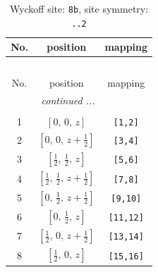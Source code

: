 \documentclass[fleqn,8pt]{jsarticle}
\begin{document}
\begin{longtable}{ccc}
\caption{Wyckoff site: {\tt 8b}, site symmetry: {\tt ..2}}
 \\
 \hline \hline
No. & position & mapping \\ \hline \endfirsthead

\multicolumn{2}{l}{\tablename\ \thetable{}} \\
 \hline \hline
No. & position & mapping \\ \hline \endhead

 \hline \hline
\multicolumn{2}{r}{\footnotesize\it continued ...} \\ \endfoot

 \hline \hline
\multicolumn{2}{r}{} \\ \endlastfoot

1 & $\left[ 0,\, 0,\, z \right]$ & {\tt [1,2]} \\ \hline
2 & $\left[ 0,\, 0,\, z + \frac{1}{2} \right]$ & {\tt [3,4]} \\ \hline
3 & $\left[ \frac{1}{2},\, \frac{1}{2},\, z \right]$ & {\tt [5,6]} \\ \hline
4 & $\left[ \frac{1}{2},\, \frac{1}{2},\, z + \frac{1}{2} \right]$ & {\tt [7,8]} \\ \hline
5 & $\left[ 0,\, \frac{1}{2},\, z + \frac{1}{2} \right]$ & {\tt [9,10]} \\ \hline
6 & $\left[ 0,\, \frac{1}{2},\, z \right]$ & {\tt [11,12]} \\ \hline
7 & $\left[ \frac{1}{2},\, 0,\, z + \frac{1}{2} \right]$ & {\tt [13,14]} \\ \hline
8 & $\left[ \frac{1}{2},\, 0,\, z \right]$ & {\tt [15,16]} \\
\end{longtable}
\renewcommand{\arraystretch}{1.2}
\end{document}
